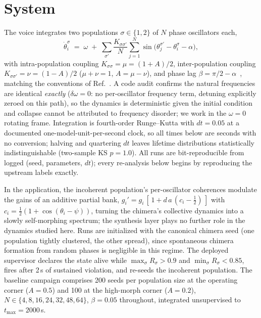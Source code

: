 \documentclass[11pt]{article}
\begin{document}
\section{System}\label{sec:system}

The voice integrates two populations $\sigma \in \{1, 2\}$ of $N$ phase oscillators
each,
\begin{equation}
\dot\theta_i^\sigma \;=\; \omega \;+\; \sum_{\sigma'} \frac{K_{\sigma\sigma'}}{N}
\sum_{j=1}^{N} \sin\!\big(\theta_j^{\sigma'} - \theta_i^{\sigma} - \alpha\big),
\label{eq:model}
\end{equation}
with intra-population coupling $K_{\sigma\sigma} = \mu = (1+A)/2$, inter-population
coupling $K_{\sigma\sigma'} = \nu = (1-A)/2$ ($\mu + \nu = 1$, $A = \mu - \nu$), and
phase lag $\beta = \pi/2 - \alpha$~\cite{kuramoto1984,sk1986}, matching the
conventions of Ref.~\cite{abrams2008}. A code audit confirms the natural frequencies are identical
\emph{exactly} ($\delta\omega = 0$: no per-oscillator frequency term, detuning
explicitly zeroed on this path), so the dynamics is deterministic given the initial
condition and collapse cannot be attributed to frequency disorder; we work in the
$\omega = 0$ rotating frame. Integration is fourth-order Runge--Kutta with
$dt = 0.05$ at a documented one-model-unit-per-second clock, so all times below are
seconds with no conversion; halving and quartering $dt$ leaves lifetime
distributions statistically indistinguishable (two-sample KS $p = 1.0$). All runs are
bit-reproducible from logged (seed, parameters, $dt$); every re-analysis below begins
by reproducing the upstream labels exactly.

In the application, the incoherent population's per-oscillator coherences modulate
the gains of an additive partial bank, $g_i' = g_i\,[\,1 + d\,a\,(c_i - \tfrac12)\,]$
with $c_i = \tfrac12(1 + \cos(\theta_i - \psi))$, turning the chimera's collective
dynamics into a slowly self-morphing spectrum; the synthesis layer plays no further
role in the dynamics studied here. Runs are initialized with the canonical chimera
seed (one population tightly clustered, the other spread), since spontaneous chimera
formation from random phases is negligible in this regime. The deployed supervisor
declares the state alive while $\max_\sigma R_\sigma > 0.9$ and
$\min_\sigma R_\sigma < 0.85$, fires after 2\,s of sustained violation, and re-seeds
the incoherent population. The baseline campaign comprises 200 seeds per population
size at the operating corner ($A = 0.5$) and 100 at the high-morph corner
($A = 0.2$), $N \in \{4, 8, 16, 24, 32, 48, 64\}$, $\beta = 0.05$ throughout,
integrated unsupervised to $t_{\max} = 2000$\,s.
\end{document}
